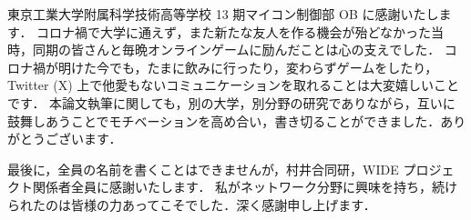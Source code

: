 東京工業大学附属科学技術高等学校 13 期マイコン制御部 OB に感謝いたします．
コロナ禍で大学に通えず，また新たな友人を作る機会が殆どなかった当時，同期の皆さんと毎晩オンラインゲームに励んだことは心の支えでした．
コロナ禍が明けた今でも，たまに飲みに行ったり，変わらずゲームをしたり，Twitter (X) 上で他愛もないコミュニケーションを取れることは大変嬉しいことです．
本論文執筆に関しても，別の大学，別分野の研究でありながら，互いに鼓舞しあうことでモチベーションを高め合い，書き切ることができました．ありがとうございます．

最後に，全員の名前を書くことはできませんが，村井合同研，WIDE プロジェクト関係者全員に感謝いたします．
私がネットワーク分野に興味を持ち，続けられたのは皆様の力あってこそでした．深く感謝申し上げます．